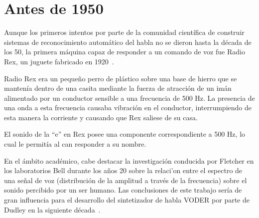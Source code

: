 \section{Antes de 1950}
\label{sec:pre50s}

Aunque los primeros intentos por parte de la comunidad cient\'{i}fica de construir sistemas de reconocimiento autom\'{a}tico del habla no se dieron hasta la d\'{e}cada de los 50, la primera m\'{aquina} capaz de responder
a un comando de voz fue Radio Rex, un juguete fabricado en \mbox{1920 \cite{AnusuyaSpeech2009}}.

Radio Rex era un peque\~{n}o perro de pl\'{a}stico sobre una base de hierro que se manten\'{i}a dentro de una casita
mediante la fuerza de atracci\'{o}n de un im\'{a}n alimentado por un conductor sensible a una frecuencia de 500 Hz.
La presencia de una onda a esta frecuencia causaba vibraci\'{o}n en el conductor, interrumpiendo de
esta manera la corriente y causando que Rex saliese de su casa. 

El sonido de la ``e'' en Rex posee una componente correspondiente a 500 Hz, lo cual le permit\'{i}a al can responder a su nombre.

En el \'{a}mbito acad\'{e}mico, cabe destacar la investigaci\'{o}n conducida por Fletcher en los laboratorios Bell
durante los a\~{n}os 20 sobre la relaci'{o}n entre el espectro de una se\~{n}al de voz (distribuci\'{o}n de 
la amplitud a trav\'{e}s de la frecuencia) sobre el sonido percibido por un ser humano. Las conclusiones de 
este trabajo ser\'{i}a de gran influencia para el desarrollo del sintetizador de habla VODER por parte de 
Dudley en la siguiente \mbox{d\'{e}cada \cite{JuangAutomaticSpeech}}. 